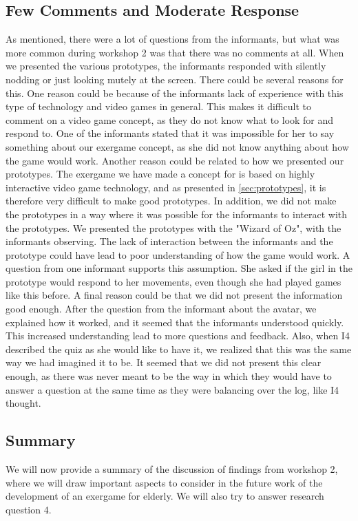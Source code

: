 \subsection{Few Comments and Moderate Response}
As mentioned, there were a lot of questions from the informants, but what was more common during workshop 2 was that there was no comments at all. When we presented the various prototypes, the informants responded with silently nodding or just looking mutely at the screen. There could be several reasons for this. One reason could be because of the informants lack of experience with this type of technology and video games in general. This makes it difficult to comment on a video game concept, as they do not know what to look for and respond to. One of the informants stated that it was impossible for her to say something about our exergame concept, as she did not know anything about how the game would work. Another reason could be related to how we presented our prototypes. The exergame we have made a concept for is based on highly interactive video game technology, and as presented in \ref{sec:prototypes}, it is therefore very difficult to make good prototypes. In addition, we did not make the prototypes in a way where it was possible for the informants to interact with the prototypes. We presented the prototypes with the "Wizard of Oz", with the informants observing. The lack of interaction between the informants and the prototype could have lead to poor understanding of how the game would work. A question from one informant supports this assumption. She asked if the girl in the prototype would respond to her movements, even though she had played games like this before. A final reason could be that we did not present the information good enough. After the question from the informant about the avatar, we explained how it worked, and it seemed that the informants understood quickly. This increased understanding lead to more questions and feedback. Also, when I4 described the quiz as she would like to have it, we realized that this was the same way we had imagined it to be. It seemed that we did not present this clear enough, as there was never meant to be the way in which they would have to answer a question at the same time as they were balancing over the log, like I4 thought.   

\subsection{Summary}
We will now provide a summary of the discussion of findings from workshop 2, where we will draw important aspects to consider in the future work of the development of an exergame for elderly. We will also try to answer research question 4.

